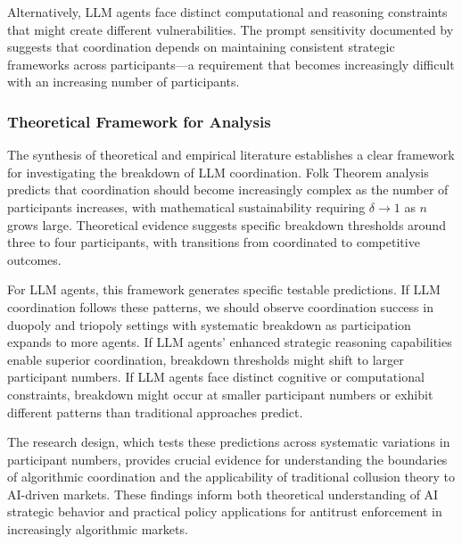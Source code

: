 Alternatively, LLM agents face distinct computational and reasoning constraints that might create different vulnerabilities. The prompt sensitivity documented by \textcite{fish_algorithmic_2025} suggests that coordination depends on maintaining consistent strategic frameworks across participants---a requirement that becomes increasingly difficult with an increasing number of participants.

\subsubsection*{Theoretical Framework for Analysis}

The synthesis of theoretical and empirical literature establishes a clear framework for investigating the breakdown of LLM coordination. Folk Theorem analysis predicts that coordination should become increasingly complex as the number of participants increases, with mathematical sustainability requiring $\delta \rightarrow 1$ as $n$ grows large. Theoretical evidence suggests specific breakdown thresholds around three to four participants, with transitions from coordinated to competitive outcomes.

For LLM agents, this framework generates specific testable predictions. If LLM coordination follows these patterns, we should observe coordination success in duopoly and triopoly settings with systematic breakdown as participation expands to more agents. If LLM agents' enhanced strategic reasoning capabilities enable superior coordination, breakdown thresholds might shift to larger participant numbers. If LLM agents face distinct cognitive or computational constraints, breakdown might occur at smaller participant numbers or exhibit different patterns than traditional approaches predict.

The research design, which tests these predictions across systematic variations in participant numbers, provides crucial evidence for understanding the boundaries of algorithmic coordination and the applicability of traditional collusion theory to AI-driven markets. These findings inform both theoretical understanding of AI strategic behavior and practical policy applications for antitrust enforcement in increasingly algorithmic markets.
